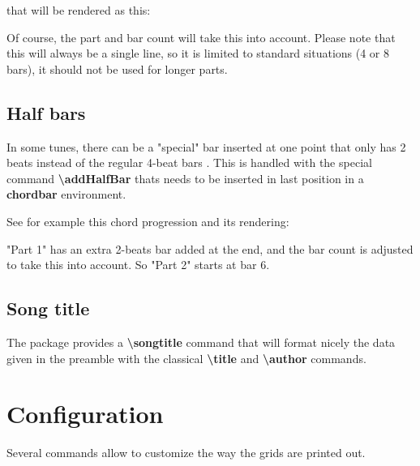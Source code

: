 \documentclass[11pt]{article}
\newcommand{\btt}{\bfseries \ttfamily }
\newcommand{\tbs}{\textbackslash{}}
\begin{document}
that will be rendered as this:


Of course, the part and bar count will take this into account.
Please note that this will always be a single line, so it is limited to standard situations (4 or 8 bars), it should not be used for longer parts.

\subsection{Half bars}

In some tunes, there can be a "special" bar inserted at one point that only has 2 beats instead of the regular 4-beat bars .
This is handled with the special command {\btt \tbs addHalfBar} thats needs to be inserted in last position in a {\btt chordbar} environment.

See for example this chord progression and its rendering:



\resetchordbars
\countbarsYes


"Part 1" has an extra 2-beats bar added at the end, and the bar count is adjusted to take this into account.
So "Part 2" starts at bar 6.

\subsection{Song title}

The package provides a {\btt \tbs songtitle} command that will format nicely the data given in the preamble with the classical 
{\btt \tbs title} and {\btt \tbs author} commands.


\section{Configuration}
\label{sec:config}

Several commands allow to customize the way the grids are printed out.
\end{document}
